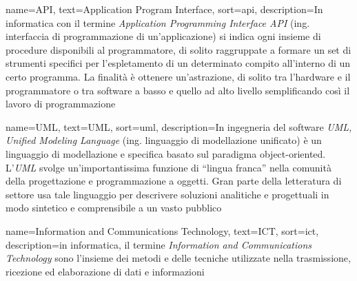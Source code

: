 









{
    name=API,
    text=Application Program Interface,
    sort=api,
    description={In informatica con il termine \emph{Application Programming Interface API} (ing. interfaccia di programmazione di un'applicazione) si indica ogni insieme di procedure disponibili al programmatore, di solito raggruppate a formare un set di strumenti specifici per l'espletamento di un determinato compito all'interno di un certo programma. La finalità è ottenere un'astrazione, di solito tra l'hardware e il programmatore o tra software a basso e quello ad alto livello semplificando così il lavoro di programmazione}
}

{
    name=UML,
    text=UML,
    sort=uml,
    description={In ingegneria del software \emph{UML, Unified Modeling Language} (ing. linguaggio di modellazione unificato) è un linguaggio di modellazione e specifica basato sul paradigma object-oriented. L'\emph{UML} svolge un'importantissima funzione di ``lingua franca'' nella comunità della progettazione e programmazione a oggetti. Gran parte della letteratura di settore usa tale linguaggio per descrivere soluzioni analitiche e progettuali in modo sintetico e comprensibile a un vasto pubblico}
}

{
    name=Information and Communications Technology,
    text=ICT,
    sort=ict,
    description={in informatica, il termine \emph{Information and Communications Technology} sono l'insieme dei metodi e delle tecniche utilizzate nella trasmissione, ricezione ed elaborazione di dati e informazioni}
}

